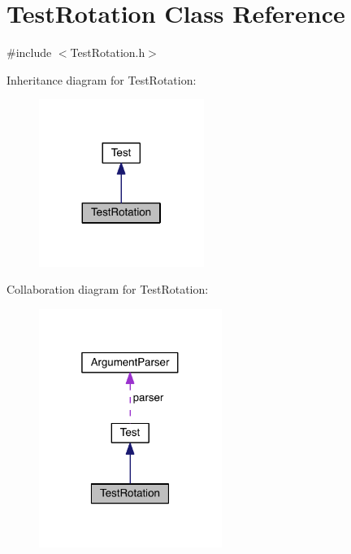 \hypertarget{class_test_rotation}{}\section{Test\+Rotation Class Reference}
\label{class_test_rotation}


{\ttfamily \#include $<$Test\+Rotation.\+h$>$}



Inheritance diagram for Test\+Rotation\+:\nopagebreak
\begin{figure}[H]
\begin{center}
\leavevmode
\includegraphics[width=152pt]{d9/dae/class_test_rotation__inherit__graph}
\end{center}
\end{figure}


Collaboration diagram for Test\+Rotation\+:\nopagebreak
\begin{figure}[H]
\begin{center}
\leavevmode
\includegraphics[width=169pt]{db/def/class_test_rotation__coll__graph}
\end{center}
\end{figure}
